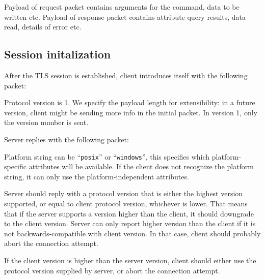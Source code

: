 Payload of request packet contains arguments for the command, data to be written etc. Payload of response
packet contains attribute query results, data read, details of error etc. 

%

\subsection{Session initalization}

After the TLS session is established, client introduces itself with the following packet:
\beginpk
\endpk

Protocol version is 1. We specify the payload length for extensibility: in a future version, client might be
sending more info in the initial packet. In version 1, only the version number is sent.

Server replies with the following packet:
\beginpk
\endpk

Platform string can be ``{\tt posix}'' or ``{\tt windows}'', this specifies which platform-specific attributes
will be available. If the client does not recognize the platform string, it can only use the
platform-independent attributes.

Server should reply with a protocol version that is either the highest version supported, or equal to client
protocol version, whichever is lower. That means that if the server supports a version higher than the client,
it should downgrade to the client version. Server can only report higher version than the client if it is not
backwards-compatible with client version. In that case, client should probably abort the connection attempt.

If the client version is higher than the server version, client should either use the protocol version
supplied by server, or abort the connection attempt.

